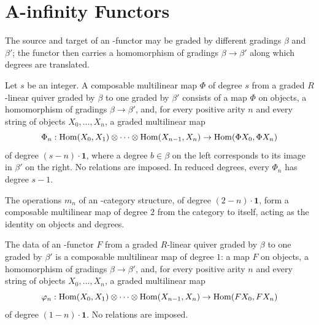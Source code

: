 \section{A-infinity Functors}

The source and target of an \Ainf{}-functor may be graded by different
gradings $\beta$ and $\beta'$; the functor then carries a homomorphism of
gradings $\beta \to \beta'$ along which degrees are translated.

\begin{definition}
\label{AInfinityTheory.ComposableMultilinearMap}
\leanok
{}
Let $s$ be an integer. A composable multilinear map $\Phi$ of degree $s$ from a graded $R$-linear
quiver graded by $\beta$ to one graded by $\beta'$ consists of a map $\Phi$ on objects, a
homomorphism of gradings $\beta \to \beta'$, and, for every positive arity $n$ and every string
of objects $X_0,\dots,X_n$, a graded multilinear map
\[
  \Phi_n : \operatorname{Hom}(X_0,X_1) \otimes \cdots \otimes \operatorname{Hom}(X_{n-1},X_n) \to \operatorname{Hom}(\Phi X_0, \Phi X_n)
\]
of degree $(s-n) \cdot \mathbf{1}$, where a degree $b \in \beta$ on the left corresponds to its
image in $\beta'$ on the right. No relations are imposed. In reduced degrees, every $\Phi_n$ has
degree $s - 1$.

The operations $m_n$ of an \Ainf{}-category structure, of degree $(2-n) \cdot \mathbf{1}$, form a
composable multilinear map of degree $2$ from the category to itself, acting as the identity on
objects and degrees.
\end{definition}

\begin{definition}
\label{AInfinityTheory.AInfinityFunctorData}
\leanok
{}
The data of an \Ainf{}-functor $F$ from a graded $R$-linear quiver graded by
$\beta$ to one graded by $\beta'$ is a composable multilinear map of degree $1$: a map $F$ on
objects, a homomorphism of gradings $\beta \to \beta'$, and, for every positive arity $n$ and
every string of objects $X_0,\dots,X_n$, a graded multilinear map
\[
  \varphi_n : \operatorname{Hom}(X_0,X_1) \otimes \cdots \otimes \operatorname{Hom}(X_{n-1},X_n) \to \operatorname{Hom}(FX_0, FX_n)
\]
of degree $(1-n) \cdot \mathbf{1}$. No relations are imposed.
\end{definition}

